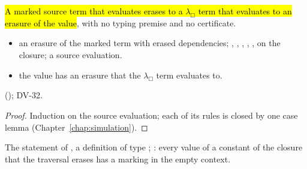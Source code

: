 \begin{theorem}[Simulation]
  \label{thm:EraseProof-erases_correct}
  \leanok
   \hl{A marked source term that evaluates erases to a $\lambda_\Box$ term that evaluates to an erasure of the value}, with no typing premise and no certificate.
  \begin{itemize}
  \item {} an erasure of the marked term with erased dependencies; , , , , ,  on the closure; a source evaluation.
  \item {} the value has an erasure that the $\lambda_\Box$ term evaluates to.
  \end{itemize}
    (); DV-32.
\end{theorem}
\begin{proof}
  \leanok
   Induction on the source evaluation; each of its rules is closed by one case lemma (Chapter~\ref{chap:simulation}).
\end{proof}

\begin{definition}
  \label{def:EraseProof-erasePure_erases-statement}
  \leanok
   The statement of , a definition of type ; : every value of a constant of the closure that the traversal erases has a marking in the empty context.
\end{definition}

